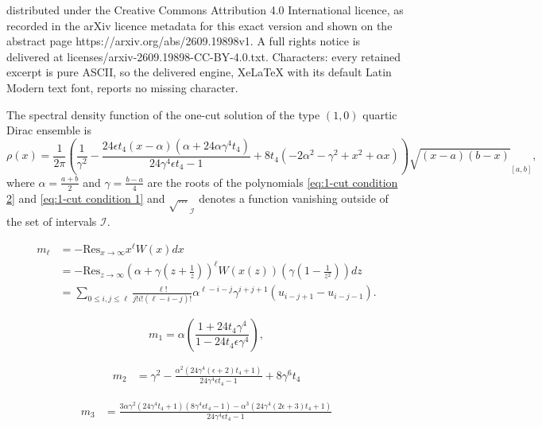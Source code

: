 \documentclass[10pt,a4paper]{amsart}
\begin{document}
distributed under the Creative Commons Attribution 4.0 International licence, as recorded in the arXiv licence metadata for this exact version and shown on the abstract page https://arxiv.org/abs/2609.19898v1. A full rights notice is delivered at licenses/arxiv-2609.19898-CC-BY-4.0.txt. Characters: every retained excerpt is pure ASCII, so the delivered engine, XeLaTeX with its default Latin Modern text font, reports no missing character.
	\begin{theorem}\label{thm: one-cut density}
			The spectral density function of the one-cut solution of the type $(1,0)$  quartic Dirac ensemble is
		\begin{equation*}
		\rho(x) = \frac{1}{2\pi} \left(\frac{1}{\gamma ^2}-\frac{24 \epsilon t_{4} (x-\alpha ) \left(\alpha +24 \alpha \gamma ^4 t_4\right)}{24 \gamma ^4
 \epsilon t_{4}-1}+8 t_{4} \left(-2 \alpha ^2-\gamma ^2+x^2+\alpha x\right)\right)\sqrt{(x-a)(b-x)}_{[a,b]},
		\end{equation*}
 where $\alpha = \frac{a+b}{2}$ and $\gamma =\frac{b-a}{4}$ are the roots of the polynomials \eqref{eq:1-cut condition 2} and \eqref{eq:1-cut condition 1} and $\sqrt{\ldots}_\mathcal I$ denotes a function vanishing outside of the set of intervals $\mathcal I$.
	\end{theorem}

	\begin{align}\label{eq:residue formula for moments one-cut}
		m_{\ell} &= - \text{Res}_{x\rightarrow \infty} x^{\ell} W(x) dx\\
		&= - \text{Res}_{z\rightarrow \infty} \left(\alpha + \gamma\left(z+\frac{1}{z}\right) \right)^{\ell} W(x(z)) \left( \gamma\left(1-\frac{1}{z^2}\right)\right)dz\\
		&= \sum_{0\leq i,j\leq\ell} \frac{\ell!}{j! i!(\ell-i-j)!}\alpha^{\ell-i-j}\gamma^{i+j+1}(u_{i-j+1}-u_{i-j-1}).
	\end{align}

	\begin{equation}\label{eq:m1 one-cut}
		m_1 = \alpha \left(\frac{1+24 t_{4}\gamma^4}{1-24 t_{4}\epsilon\gamma^4}\right),
	\end{equation}

	\begin{align}\label{eq:m2 one-cut}
		m_{2} &=\gamma ^2-\frac{\alpha ^2 \left(24 \gamma ^4 (\epsilon+2) t_{4}+1\right)}{24 \gamma ^4
 \epsilon t_{4}-1}+8 \gamma ^6 t_{4}
 \end{align}

 \begin{align}\label{eq:m3 one-cut}
		m_3 &=\frac{3 \alpha \gamma ^2 \left(24 \gamma ^4 t_{4}+1\right) \left(8 \gamma ^4 \epsilon
 t_{4}-1\right)-\alpha ^3 \left(24 \gamma ^4 (2 \epsilon+3) t_{4}+1\right)}{24 \gamma ^4
 \epsilon t_{4}-1}
 \end{align}
\end{document}
